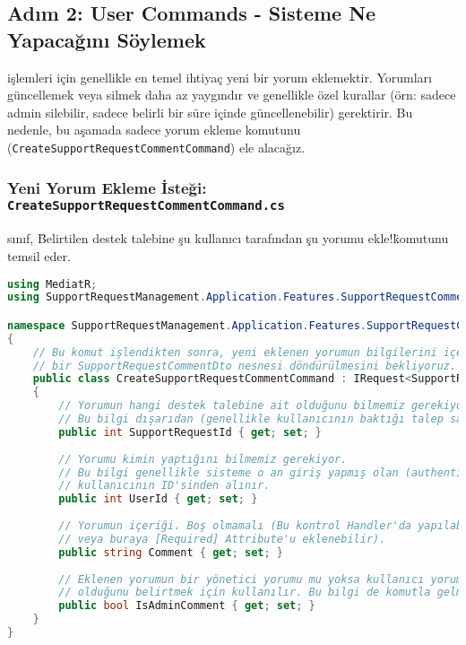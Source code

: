 \documentclass[11pt, a4paper]{article}
\begin{document}
\subsection{Adım 2: User Commands - Sisteme Ne Yapacağını Söylemek}
\nYorum işlemleri için genellikle en temel ihtiyaç yeni bir yorum eklemektir. Yorumları güncellemek veya silmek daha az yaygındır ve genellikle özel kurallar (örn: sadece admin silebilir, sadece belirli bir süre içinde güncellenebilir) gerektirir. Bu nedenle, bu aşamada sadece yorum ekleme komutunu (\texttt{CreateSupportRequestCommentCommand}) ele alacağız.

\subsubsection{Yeni Yorum Ekleme İsteği: \texttt{CreateSupportRequestCommentCommand.cs}}
\nBu sınıf, \"Belirtilen destek talebine şu kullanıcı tarafından şu yorumu ekle!\" komutunu temsil eder.

\begin{lstlisting}[language=C#]
using MediatR;
using SupportRequestManagement.Application.Features.SupportRequestComment.Dtos; // Dönecek cevap tipi

namespace SupportRequestManagement.Application.Features.SupportRequestComment.Commands
{
    // Bu komut işlendikten sonra, yeni eklenen yorumun bilgilerini içeren
    // bir SupportRequestCommentDto nesnesi döndürülmesini bekliyoruz.
    public class CreateSupportRequestCommentCommand : IRequest<SupportRequestCommentDto>
    {
        // Yorumun hangi destek talebine ait olduğunu bilmemiz gerekiyor.
        // Bu bilgi dışarıdan (genellikle kullanıcının baktığı talep sayfasından) gelir.
        public int SupportRequestId { get; set; }
        
        // Yorumu kimin yaptığını bilmemiz gerekiyor.
        // Bu bilgi genellikle sisteme o an giriş yapmış olan (authenticated)
        // kullanıcının ID'sinden alınır.
        public int UserId { get; set; }
        
        // Yorumun içeriği. Boş olmamalı (Bu kontrol Handler'da yapılabilir
        // veya buraya [Required] Attribute'u eklenebilir).
        public string Comment { get; set; }
        
        // Eklenen yorumun bir yönetici yorumu mu yoksa kullanıcı yorumu mu
        // olduğunu belirtmek için kullanılır. Bu bilgi de komutla gelmelidir.
        public bool IsAdminComment { get; set; }
    }
}
\end{lstlisting}
\end{document}
